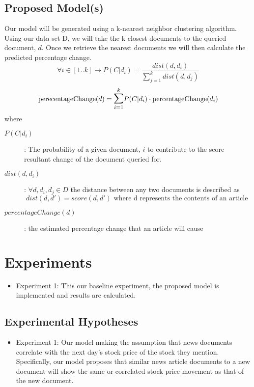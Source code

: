 \documentclass[11pt,letterpaper]{article}
\newcommand{\blue}[1]{\textcolor{RoyalBlue}{#1}}
\newcommand{\instructions}[1]{\blue{\textit{#1}}}
\begin{document}
\subsection{Proposed Model(s)}
\label{sec:proposed-models}
Our model will be generated using a k-nearest neighbor clustering algorithm.  Using our data set D, we will take the k closest documents to the queried document, \(d\). Once we retrieve the nearest documents we will then calculate the predicted percentage change.
\[
	 \forall i \in [1..k] \rightarrow P(C | d_i) = \frac{ dist(d,d_i) }{\sum^k_{j=1} dist(d, d_j)}
\]
\[
	\text{perecentageChange}(d) = \mathlarger{\mathlarger{\sum}}^k_{i=1} P(C | d_i) \cdot \text{percentageChange}(d_i)
\]
where
\begin{description}
	\item[\(P(C | d_i)\)] : The probability of a given document, \( i \) to contribute to the score resultant change of the document queried for.
	\item[\textbf{\(dist(d,d_i)\)}] : \( \forall d, d_i, d_j \in D \) the distance between any two documents is described as
	\[
		dist(d, d') = score(d, d') \text{ where d represents the contents of an article }
	\]
	\item[\(percentageChange(d)\)] : the estimated percentage change that an article will cause
\end{description}

\section{Experiments}
\begin{itemize}
  \item Experiment 1: This our baseline experiment, the proposed model is
  implemented and results are calculated.
\end{itemize}

\subsection{Experimental Hypotheses}
\label{sec:exper-hypoth}
\begin{itemize}
  \item Experiment 1: Our model making the assumption that news documents
  correlate with the next day's stock price of the stock they mention.
  Specifically, our model proposes that similar news article documents to a new
  document will show the same or correlated stock price movement as that of the new document.
\end{itemize}
\end{document}
